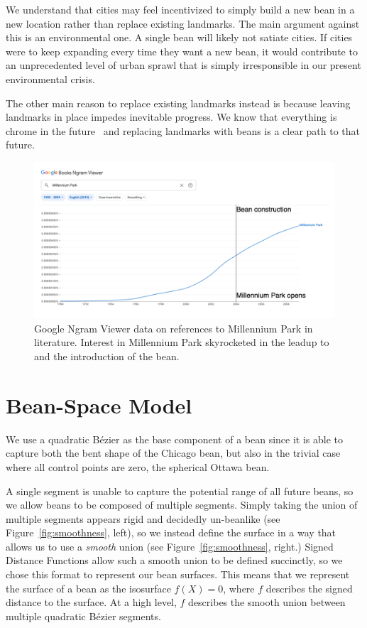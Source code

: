\documentclass[%
reprint,
twocolumn,
nofootinbib,
 amsmath,amssymb,
 aps,
]{revtex4-2}
\begin{document}
We understand that cities may feel incentivized to simply build a new bean in a new location rather than replace existing landmarks. The main argument against this is an environmental one. A single bean will likely not satiate cities. If cities were to keep expanding every time they want a new bean, it would contribute to an unprecedented level of urban sprawl that is simply irresponsible in our present environmental crisis.

The other main reason to replace existing landmarks instead is because leaving landmarks in place impedes inevitable progress. We know that everything is chrome in the future~\cite{everythingChrome} and replacing landmarks with beans is a clear path to that future.

\begin{figure}
    \includegraphics[width=0.98\linewidth]{img/ngram.png}
    \caption{Google Ngram Viewer data on references to Millennium Park in literature. Interest in Millennium Park skyrocketed in the leadup to and the introduction of the bean.}
    \label{fig:ngram}
\end{figure}

\section{Bean-Space Model}
\label{sec:method}

We use a quadratic B\'ezier as the base component of a bean since it is able to capture both the bent shape of the Chicago bean, but also in the trivial case where all control points are zero, the spherical Ottawa bean.

A single segment is unable to capture the potential range of all future beans, so we allow beans to be composed of multiple segments. Simply taking the union of multiple segments appears rigid and decidedly un-beanlike (see Figure~\ref{fig:smoothness}, left), so we instead define the surface in a way that allows us to use a \emph{smooth} union (see Figure~\ref{fig:smoothness}, right.) Signed Distance Functions allow such a smooth union to be defined succinctly, so we chose this format to represent our bean surfaces. This means that we represent the surface of a bean as the isosurface $f(X) = 0$, where $f$ describes the signed distance to the surface. At a high level, $f$ describes the smooth union between multiple quadratic B\'ezier segments.
\end{document}
